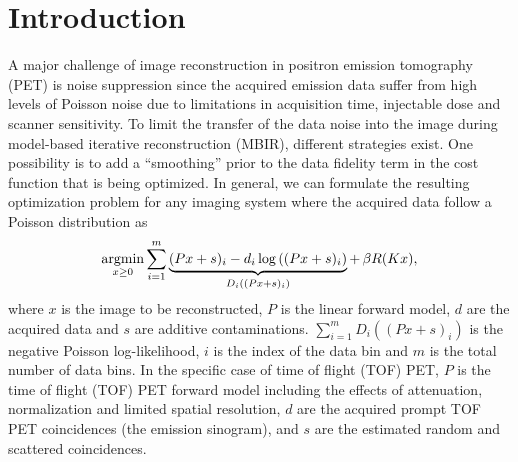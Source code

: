 %

\newcommand{\todo}[1]{\textcolor{red}{ #1}}
\section{Introduction}

A major challenge of image reconstruction in positron emission tomography (PET)
is noise suppression since the acquired emission data suffer from high levels of Poisson
noise due to limitations in acquisition time, injectable dose and scanner sensitivity.
To limit the transfer of the data noise into the image during model-based iterative
reconstruction (MBIR), different strategies exist. 
One possibility is to add a ``smoothing'' prior to the data fidelity term in the cost
function that is being optimized.
In general, we can formulate the resulting optimization problem for any imaging system where the
acquired data follow a Poisson distribution as
%
\begin{equation}
\operatorname*{argmin} _{x\geq 0} \sum_{i=1}^{m} \underbrace{(Px + s)_i -  d_i \log \left( (Px + s)_i \right)}_{D_i((Px+s)_i)} + \, \beta R(Kx),
\label{eq:primal} 
\end{equation}
%
where $x$ is the image to be reconstructed, $P$ is the linear forward model, $d$ are the acquired
data and $s$ are additive contaminations.
$\sum_{i=1}^m D_i((Px + s)_i)$ is the negative Poisson log-likelihood, 
$i$ is the index of the data bin and $m$ is the total number of data bins.
In the specific case of time of flight (TOF) PET, $P$ is the time of flight (TOF) PET
forward model including the effects of attenuation, normalization and limited spatial resolution, 
$d$ are the acquired prompt TOF PET coincidences (the emission sinogram), 
and $s$ are the estimated random and scattered coincidences. 

